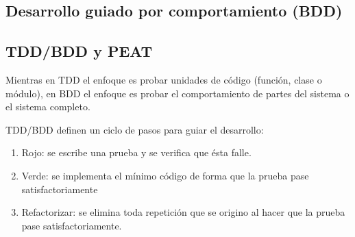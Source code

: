\subsection{Desarrollo guiado por comportamiento (BDD)}
\subsection{TDD/BDD y PEAT}


Mientras en TDD el enfoque es probar unidades de código (función, clase o módulo),
en BDD el enfoque es probar el comportamiento de partes del sistema o el sistema
completo.

\vspace{2.5mm}

TDD/BDD definen un ciclo de pasos para guiar el desarrollo:

\begin{enumerate}
\item Rojo: se escribe una prueba y se verifica que ésta falle.
\item Verde: se implementa el mínimo código de forma que la prueba pase
  satisfactoriamente
\item Refactorizar: se elimina toda repetición que se origino al
  hacer que la prueba pase satisfactoriamente.
\end{enumerate}

